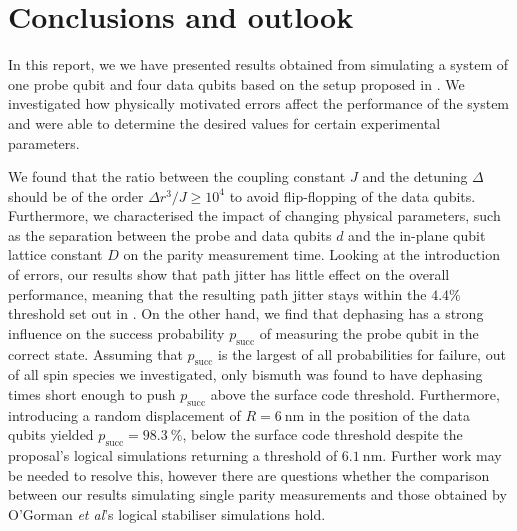 
\section{Conclusions and outlook } \label{sec:conclusions}
In this report, we we have presented results obtained from simulating a system of one probe qubit and four data qubits based on the setup proposed in \cite{OGorman2016}. We investigated how physically motivated errors affect the performance of the system and were able to determine the desired values for certain experimental parameters. 

We found that the ratio between the coupling constant $J$ and the detuning $\Delta$ should be of the order $\Delta r^3/J \ge 10^4$ to avoid flip-flopping of the data qubits. Furthermore, we characterised the impact of changing physical parameters, such as the separation between the probe and data qubits $d$ and the in-plane qubit lattice constant $D$ on the parity measurement time.  
Looking at the introduction of errors, our results show that path jitter has little effect on the overall performance, meaning that the resulting path jitter stays within the $4.4\%$ threshold set out in \cite{OGorman2016}. On the other hand, we find that dephasing has a strong influence on the success probability $p_{\textrm{succ}}$ of measuring the probe qubit in the correct state. Assuming that $p_{\textrm{succ}}$ is the largest of all probabilities for failure, out of all spin species we investigated, only bismuth was found to have dephasing times short enough to push $p_{\textrm{succ}}$ above the surface code threshold. Furthermore, introducing a random displacement of $R = \SI{6}{\nano\metre}$ in the position of the data qubits yielded $p_{\textrm{succ}} = \SI{98.3}{\percent}$, below the surface code threshold \cite{Wang2011,Fowler2012} despite the proposal's logical simulations returning a threshold of $\SI{6.1}{\nano\metre}$. Further work may be needed to resolve this, however there are questions whether the comparison between our results simulating single parity measurements and those obtained by O'Gorman \textit{et al}'s logical stabiliser simulations hold.




